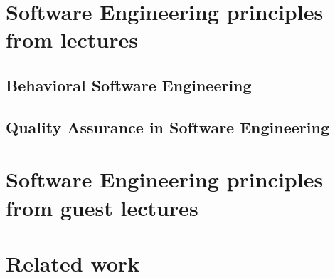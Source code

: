 \documentclass[a4paper,twocolumn]{article}
\begin{document}
\section*{Software Engineering principles from lectures}

\subsection*{Behavioral Software Engineering}

\subsection*{Quality Assurance in Software Engineering}

\section*{Software Engineering principles from guest lectures}

\section*{Related work}



\end{document}
